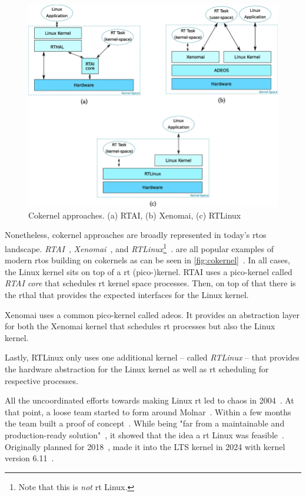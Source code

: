 \documentclass[10pt,twocolumn,a4paper]{article}
\begin{document}
\begin{figure}[ht]
  \centering
  \includegraphics[scale=.50, clip]{assets/cokernel.png}
  \caption{Cokernel approaches. (a) RTAI, (b) Xenomai, (c) RTLinux~\cite{reghenzani_realtime_2019} \label{fig:cokernel}}
\end{figure}
Nonetheless, cokernel approaches are broadly represented in today's \acrshort{rtos} landscape.
\emph{RTAI}~\cite{rtai-docs}, \emph{Xenomai}~\cite{xenomai-docs}, and \emph{RTLinux}\footnote{Note that this is \emph{not} \acrlong{rt} Linux.}~\cite{rtlinux}. are all popular examples of modern \acrshort{rtos} building on cokernels as can be seen in \autoref{fig:cokernel}~\cite{reghenzani_realtime_2019}.
In all cases, the Linux kernel sits on top of a \acrshort{rt} (pico-)kernel.
RTAI uses a pico-kernel called \emph{RTAI core} that schedules \acrshort{rt} kernel space processes.
Then, on top of that there is the \acrfull{rthal} that provides the expected interfaces for the Linux kernel.

Xenomai uses a common pico-kernel called \acrfull{adeos}.
It provides an abstraction layer for both the Xenomai kernel that schedules \acrshort{rt} processes but also the Linux kernel.

Lastly, RTLinux only uses one additional kernel -- called \emph{RTLinux} -- that provides the hardware abstraction for the Linux kernel as well as \acrshort{rt} scheduling for respective processes.
\newline

\noindent All the uncoordinated efforts towards making Linux \acrshort{rt} led to chaos in 2004~\cite{perlow_trenches_2021}.
At that point, a loose team started to form around Molnar~\cite{perlow_trenches_2021}.
Within a few months the team built a proof of concept~\cite{perlow_trenches_2021}.
While being "far from a maintainable and production-ready solution"~\cite[Gleixner]{perlow_trenches_2021}, it showed that the idea a \acrshort{rt} Linux was feasible~\cite{perlow_trenches_2021}.
Originally planned for 2018~\cite{lf:history},  made it into the LTS kernel in 2024 with kernel version 6.11~\cite{lf:versions}.
\end{document}
